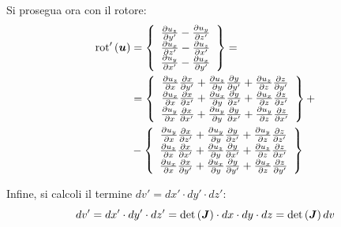 Si prosegua ora con il rotore:
\begin{align}
\label{eq:4boundaryrot2d_bis}
\text{rot}'\left(\boldsymbol{u}\right) &= \left\{
\begin{array}{c}
\frac{\partial u_z}{\partial y'}-\frac{\partial u_y}{\partial z'}\\
\frac{\partial u_x}{\partial z'}-\frac{\partial u_z}{\partial x'}\\
\frac{\partial u_y}{\partial x'}-\frac{\partial u_x}{\partial y'}\\
\end{array}
\right\} = \nonumber \\
&=\left\{
\begin{array}{c}
\frac{\partial u_z}{\partial x} \frac{\partial x}{\partial y'}+\frac{\partial u_z}{\partial y} \frac{\partial y}{\partial y'}+\frac{\partial u_z}{\partial z} \frac{\partial z}{\partial y'}\\
\frac{\partial u_x}{\partial x} \frac{\partial x}{\partial z'}+\frac{\partial u_x}{\partial y} \frac{\partial y}{\partial z'}+\frac{\partial u_x}{\partial z} \frac{\partial z}{\partial z'}\\
\frac{\partial u_y}{\partial x} \frac{\partial x}{\partial x'}+\frac{\partial u_y}{\partial y} \frac{\partial y}{\partial x'}+\frac{\partial u_y}{\partial z} \frac{\partial z}{\partial x'}
\end{array}\right\}+\nonumber\\
&-\left\{
\begin{array}{c}
\frac{\partial u_y}{\partial x} \frac{\partial x}{\partial z'}+\frac{\partial u_y}{\partial y} \frac{\partial y}{\partial z'}+\frac{\partial u_y}{\partial z} \frac{\partial z}{\partial z'}\\
\frac{\partial u_z}{\partial x} \frac{\partial x}{\partial x'}+\frac{\partial u_z}{\partial y} \frac{\partial y}{\partial x'}+\frac{\partial u_z}{\partial z} \frac{\partial z}{\partial x'}\\
\frac{\partial u_x}{\partial x} \frac{\partial x}{\partial y'}+\frac{\partial u_x}{\partial y} \frac{\partial y}{\partial y'}+\frac{\partial u_x}{\partial z} \frac{\partial z}{\partial y'}
\end{array}
\right\}
\end{align}

Infine, si calcoli il termine $dv' = dx' \cdot dy' \cdot dz'$:
\begin{equation}
\label{4boundaryjacobian2d_bis}
dv' = dx' \cdot dy' \cdot dz' = \text{det}\left(\boldsymbol{J}\right)\cdot dx \cdot dy \cdot dz =  \text{det}\left(\boldsymbol{J}\right) dv
\end{equation}



